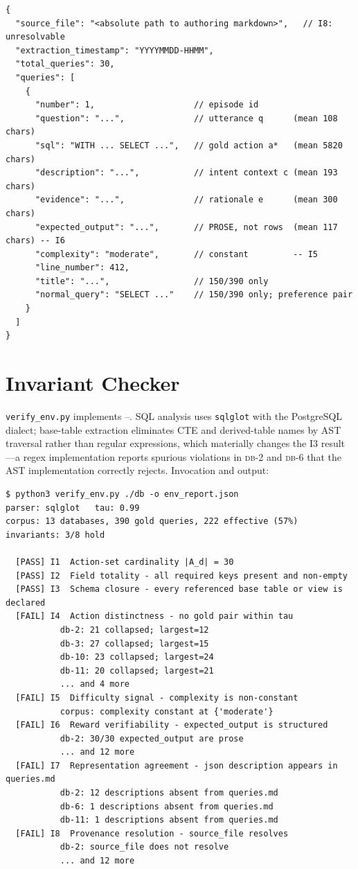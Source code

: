 \documentclass[11pt,letterpaper]{article}
\theoremstyle{definition}
\theoremstyle{plain}
\theoremstyle{remark}
\newcommand{\dbn}[1]{\textsc{db-#1}}
\newcommand{\code}[1]{\texttt{#1}}
\begin{document}
\begin{lstlisting}
{
  "source_file": "<absolute path to authoring markdown>",   // I8: unresolvable
  "extraction_timestamp": "YYYYMMDD-HHMM",
  "total_queries": 30,
  "queries": [
    {
      "number": 1,                    // episode id
      "question": "...",              // utterance q      (mean 108 chars)
      "sql": "WITH ... SELECT ...",   // gold action a*   (mean 5820 chars)
      "description": "...",           // intent context c (mean 193 chars)
      "evidence": "...",              // rationale e      (mean 300 chars)
      "expected_output": "...",       // PROSE, not rows  (mean 117 chars) -- I6
      "complexity": "moderate",       // constant         -- I5
      "line_number": 412,
      "title": "...",                 // 150/390 only
      "normal_query": "SELECT ..."    // 150/390 only; preference pair
    }
  ]
}
\end{lstlisting}

\section{Invariant Checker}
\label{app:checker}

\code{verify\_env.py} implements --. SQL analysis uses
\texttt{sqlglot} with the PostgreSQL dialect; base-table extraction eliminates CTE and
derived-table names by AST traversal rather than regular expressions, which materially changes
the I3 result---a regex implementation reports spurious violations in \dbn{2} and \dbn{6} that
the AST implementation correctly rejects. Invocation and output:

\begin{lstlisting}
$ python3 verify_env.py ./db -o env_report.json
parser: sqlglot   tau: 0.99
corpus: 13 databases, 390 gold queries, 222 effective (57%)
invariants: 3/8 hold

  [PASS] I1  Action-set cardinality |A_d| = 30
  [PASS] I2  Field totality - all required keys present and non-empty
  [PASS] I3  Schema closure - every referenced base table or view is declared
  [FAIL] I4  Action distinctness - no gold pair within tau
           db-2: 21 collapsed; largest=12
           db-3: 27 collapsed; largest=15
           db-10: 23 collapsed; largest=24
           db-11: 20 collapsed; largest=21
           ... and 4 more
  [FAIL] I5  Difficulty signal - complexity is non-constant
           corpus: complexity constant at {'moderate'}
  [FAIL] I6  Reward verifiability - expected_output is structured
           db-2: 30/30 expected_output are prose
           ... and 12 more
  [FAIL] I7  Representation agreement - json description appears in queries.md
           db-2: 12 descriptions absent from queries.md
           db-6: 1 descriptions absent from queries.md
           db-11: 1 descriptions absent from queries.md
  [FAIL] I8  Provenance resolution - source_file resolves
           db-2: source_file does not resolve
           ... and 12 more
\end{lstlisting}
\end{document}
